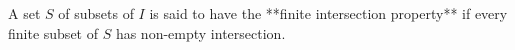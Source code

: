 A set $S$ of subsets of $I$ is said to have the **finite intersection property** if every finite subset of $S$ has non-empty intersection.
